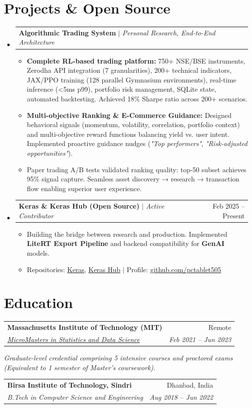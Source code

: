 \documentclass[10pt, letterpaper]{article}
\makeatletter
\newcommand{\resumeItem}[1]{
  \item\small{
    {#1 \vspace{-2pt}}
  }
}
\newcommand{\resumeSubheading}[4]{
  \vspace{-1pt}\item
    \begin{tabular*}{0.98\textwidth}[t]{l@{\extracolsep{\fill}}r}
      \textbf{#1} & {\small\color{darkgray} #2} \\
      \textit{\small#3} & \textit{\small\color{darkgray} #4} \\
    \end{tabular*}\vspace{-7pt}
}
\newcommand{\resumeProjectHeading}[2]{
    \item
    \begin{tabular*}{0.98\textwidth}{l@{\extracolsep{\fill}}r}
      \small#1 & #2 \\
    \end{tabular*}\vspace{-7pt}
}
\newcommand{\resumeSubHeadingListStart}{\begin{itemize}[leftmargin=0.15in, label={}]}
\newcommand{\resumeSubHeadingListEnd}{\end{itemize}}
\newcommand{\resumeItemListStart}{\begin{itemize}}
\newcommand{\resumeItemListEnd}{\end{itemize}\vspace{-5pt}}
\makeatother
\begin{document}
\section{Projects \& Open Source}
  \resumeSubHeadingListStart
    \resumeProjectHeading
      {\textbf{Algorithmic Trading System} $|$ \emph{Personal Research, End-to-End Architecture}}{}
      \resumeItemListStart
        \resumeItem{\textbf{Complete RL-based trading platform:} 750+ NSE/BSE instruments, Zerodha API integration (7 granularities), 200+ technical indicators, JAX/PPO training (128 parallel Gymnasium environments), real-time inference (<5ms p99), portfolio risk management, SQLite state, automated backtesting. Achieved 18\% Sharpe ratio across 200+ scenarios.}
        \resumeItem{\textbf{Multi-objective Ranking \& E-Commerce Guidance:} Designed behavioral signals (momentum, volatility, correlation, portfolio context) and multi-objective reward functions balancing yield vs. user intent. Implemented proactive guidance nudges (\textit{"Top performers"}, \textit{"Risk-adjusted opportunities"}).}
        \resumeItem{Paper trading A/B tests validated ranking quality: top-50 subset achieves 95\% signal capture. Seamless asset discovery → research → transaction flow enabling superior user experience.}
      \resumeItemListEnd

    \resumeProjectHeading
      {\textbf{Keras \& Keras Hub (Open Source)} $|$ \emph{Active Contributor}}{Feb 2025 -- Present}
      \resumeItemListStart
        \resumeItem{Building the bridge between research and production. Implemented \textbf{LiteRT Export Pipeline} and backend compatibility for \textbf{GenAI} models.}
        \resumeItem{Repositories: \href{https://github.com/keras-team/keras}{Keras}, \href{https://github.com/keras-team/keras-hub}{Keras Hub} $|$ Profile: \href{https://github.com/pctablet505}{\color{midnightblue}github.com/pctablet505}}
      \resumeItemListEnd
      
  \resumeSubHeadingListEnd

\section{Education}
  \resumeSubHeadingListStart
    \resumeSubheading
      {Massachusetts Institute of Technology (MIT)}{Remote}
      {\href{https://micromasters.mit.edu/ds}{MicroMasters in Statistics and Data Science}}{Feb 2021 -- Jun 2023}
      \vspace{-4pt}
      \small{\item{\textit{Graduate-level credential comprising 5 intensive courses and proctored exams (Equivalent to 1 semester of Master's coursework).}}}
    \resumeSubheading
      {Birsa Institute of Technology, Sindri}{Dhanbad, India}
      {B.Tech in Computer Science and Engineering}{Aug 2018 -- Jun 2022}
  \resumeSubHeadingListEnd
\end{document}
